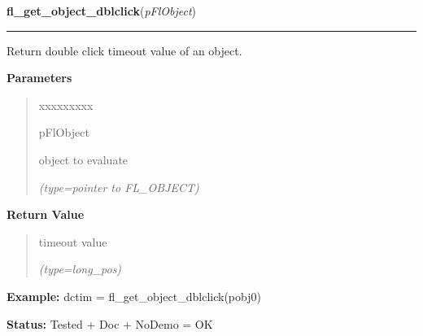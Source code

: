 \hspace{.8\funcindent}\begin{boxedminipage}{\funcwidth}

    \raggedright \textbf{fl\_get\_object\_dblclick}(\textit{pFlObject})

    \vspace{-1.5ex}

    \rule{\textwidth}{0.5\fboxrule}
\setlength{\parskip}{2ex}
    Return double click timeout value of an object.

\setlength{\parskip}{1ex}
      \textbf{Parameters}
      \vspace{-1ex}

      \begin{quote}
        \begin{Ventry}{xxxxxxxxx}

          \item[pFlObject]

          object to evaluate

            {\it (type=pointer to FL\_OBJECT)}

        \end{Ventry}

      \end{quote}

      \textbf{Return Value}
    \vspace{-1ex}

      \begin{quote}
      timeout value

      {\it (type=long\_pos)}

      \end{quote}

\textbf{Example:} dctim = fl\_get\_object\_dblclick(pobj0)



\textbf{Status:} Tested + Doc + NoDemo = OK



    \end{boxedminipage}

    \label{xformslib:flbasic:fl_set_object_geometry}

    \vspace{0.5ex}

